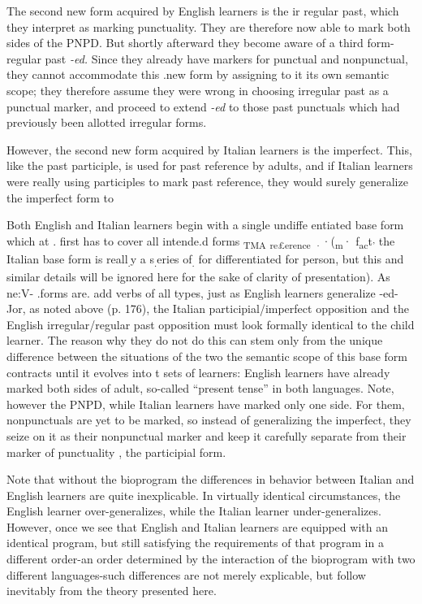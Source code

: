 The second new form acquired by English learners is the ir\-
regular past, which they interpret as marking punctuality. They are therefore now able to mark both sides of the PNPD. But shortly after\-ward they become aware of a third form-regular past \textit{-ed.} Since they already have markers for punctual and nonpunctual, they cannot ac\-commodate this .new form by assigning to it its own semantic scope; they therefore assume they were wrong in choosing irregular past as a punctual marker, and proceed to extend \textit{-ed} to those past punc\-tuals which had previously been allotted irregular forms.

However, the second new form acquired by Italian learners
is the imperfect. This, like the past participle, is used for past reference by adults, and if Italian learners were really using participles to mark past reference, they would surely generalize the imperfect form to

Both English and Italian learners begin with a single undiffe
entiated base form which at . first has to cover all intende.d forms \textsubscript{TMA}\textsubscript{ }\textsubscript{r}\textsubscript{e}\textsubscript{£}\textsubscript{erence}\textsubscript{ }\textsubscript{·}·(\textsubscript{m}· f\textsubscript{a}\textsubscript{c}t\textsubscript{'}\textsubscript{ }the Italian base form is reall\textsubscript{.}y a s\textsubscript{.}eries of\textsubscript{.}\textsubscript{ }for differentiated for person, but this and similar details will be ignored
here for the sake of clarity of presentation). As ne:V- .forms are. add
verbs of all types, just as English learners generalize -ed-Jor, as noted
above (p. 176), the Italian participial/imperfect opposition and the
English irregular/regular past opposition must look formally identical to the child learner. The reason why they do not do this can stem only from the unique difference between the situations of the two the
semantic
scope of this base form contracts until it evolves into t
sets of learners: English learners have already marked both sides of
adult, so-called ``present tense'' in both languages. Note, however
the PNPD, while Italian learners have marked only one side. For them, nonpunctuals are yet to be marked, so instead of generalizing the imperfect, they seize on it as their nonpunctual marker and keep it carefully separate from their marker of punctuality , the participial form.

Note that without the bioprogram the differences in behavior between Italian and English learners are quite inexplicable. In virtually identical circumstances, the English learner over-generalizes, while the Italian learner under-generalizes. However, once we see that English and Italian learners are equipped with an identical program, but still satisfying the requirements of that program in a different order-an order determined by the interaction of the bioprogram with two different languages-such differences are not merely explicable, but follow inevitably from the theory presented here.

